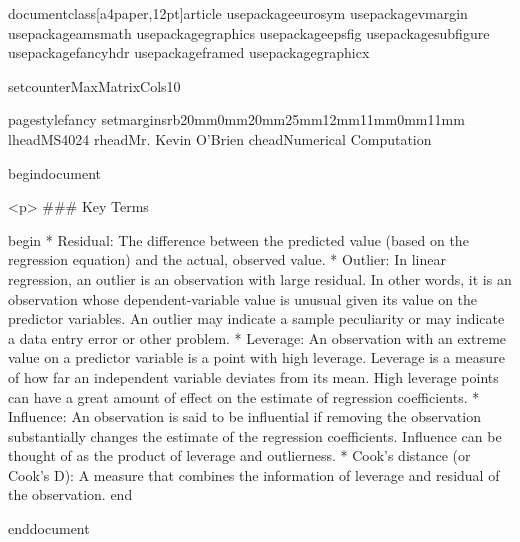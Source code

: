 
documentclass[a4paper,12pt]{article}
usepackage{eurosym}
usepackage{vmargin}
usepackage{amsmath}
usepackage{graphics}
usepackage{epsfig}
usepackage{subfigure}
usepackage{fancyhdr}
usepackage{framed}
usepackage{graphicx}

setcounter{MaxMatrixCols}{10}

pagestyle{fancy}
setmarginsrb{20mm}{0mm}{20mm}{25mm}{12mm}{11mm}{0mm}{11mm}
lhead{MS4024} rhead{Mr. Kevin O'Brien}
chead{Numerical Computation}

begin{document}

<p>
### {Key Terms}

begin{ }
         * Residual: The difference between the predicted value (based on the regression equation) and the 
actual, observed value. 
         * Outlier: In linear regression, an outlier is an observation with large residual. In other words, it is an 
observation whose dependent-variable value is unusual given its value on the predictor variables. 
An outlier may indicate a sample peculiarity or may indicate a data entry error or other problem. 
         * Leverage: An observation with an extreme value on a predictor variable is a point with high 
leverage. Leverage is a measure of how far an independent variable deviates from its mean. High 
leverage points can have a great amount of effect on the estimate of regression coefficients. 
         * Influence: An observation is said to be influential if removing the observation substantially changes 
the estimate of the regression coefficients. Influence can be thought of as the product of leverage 
and outlierness. 
         * Cook's distance (or Cook's D): A measure that combines the information of leverage and residual of 
the observation. 
end{ }



end{document}
